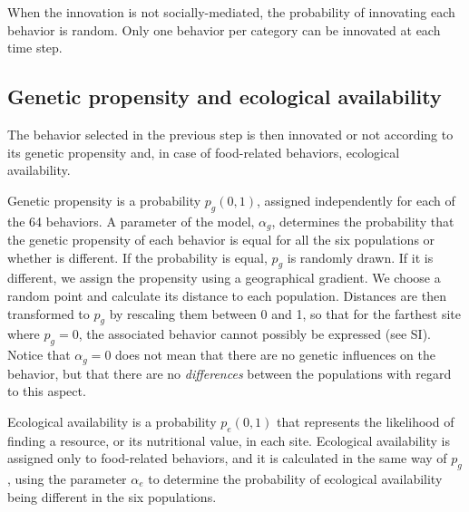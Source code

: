 \documentclass[9pt,twocolumn,twoside,]{pnas-new}
\begin{document}
When the innovation is not socially-mediated, the probability of
innovating each behavior is random. Only one behavior per category can
be innovated at each time step.

\subsection*{Genetic propensity and ecological
availability}\label{format}

The behavior selected in the previous step is then innovated or not
according to its genetic propensity and, in case of food-related
behaviors, ecological availability.

Genetic propensity is a probability \(p_g(0,1)\), assigned independently
for each of the 64 behaviors. A parameter of the model, \(\alpha_g\),
determines the probability that the genetic propensity of each behavior
is equal for all the six populations or whether is different. If the
probability is equal, \(p_g\) is randomly drawn. If it is different, we
assign the propensity using a geographical gradient. We choose a random
point and calculate its distance to each population. Distances are then
transformed to \(p_g\) by rescaling them between 0 and 1, so that for
the farthest site where \(p_g=0\), the associated behavior cannot
possibly be expressed (see SI). Notice that \(\alpha_g=0\) does not mean
that there are no genetic influences on the behavior, but that there are
no \emph{differences} between the populations with regard to this
aspect.

Ecological availability is a probability \(p_e(0,1)\) that represents
the likelihood of finding a resource, or its nutritional value, in each
site. Ecological availability is assigned only to food-related
behaviors, and it is calculated in the same way of \(p_g\), using the
parameter \(\alpha_e\) to determine the probability of ecological
availability being different in the six populations.
\end{document}
